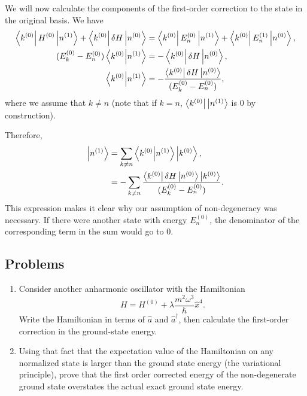 We will now calculate the components of the first-order correction to the state in the original basis. We have 
\begin{align*} 
\left\langle k^{(0)} \right|H^{(0)} \left| n^{(1)} \right\rangle + \left\langle k^{(0)} \right|\delta H \left| n^{(0)} \right\rangle &= \left\langle k^{(0)} \right|E_n^{(0)} \left| n^{(1)} \right\rangle + \left\langle k^{(0)} \right|E_n^{(1)} \left| n^{(0)} \right\rangle, \\
(E_k^{(0)}-E_n^{(0)}) \left\langle k^{(0)} \middle| n^{(1)} \right\rangle &= - \left\langle k^{(0)} \right| \delta H \left| n^{(0)} \right\rangle , \\
\left\langle k^{(0)} \middle| n^{(1)} \right\rangle &= -\frac{\left\langle k^{(0)} \right| \delta H \left| n^{(0)} \right\rangle}{(E_k^{(0)}-E_n^{(0)})},
\end{align*}
where we assume that $k \neq n$ (note that if $k=n$, $\left\langle k^{(0)} \right|\left| n^{(1)} \right\rangle$ is $0$ by construction).

Therefore,
\begin{align}
\left| n^{(1)} \right\rangle &= \sum_{k \neq n} \left\langle k^{(0)} \middle| n^{(1)} \right\rangle\left| k^{(0)} \right\rangle, \nonumber \\
&= -\sum_{k \neq n} \frac{\left\langle k^{(0)} \right| \delta H \left| n^{(0)} \right\rangle \left| k^{(0)} \right\rangle}{(E_k^{(0)}-E_n^{(0)})}. \label{eq:nondegenn1}
\end{align}
This expression makes it clear why our assumption of non-degeneracy was necessary. If there were another state with energy $E_n^{(0)}$, the denominator of the corresponding term in the sum would go to $0$.
\subsection*{Problems}
\begin{enumerate}
\item Consider another anharmonic oscillator with the Hamiltonian $$H = H^{(0)} + \lambda \frac{m^2 \omega^3}{\hbar} \hat{x}^4.$$ Write the Hamiltonian in terms of $\hat{a}$ and $\hat{a}^{\dagger}$, then calculate the first-order correction in the ground-state energy. 
\item Using that fact that the expectation value of the Hamiltonian on any normalized state is larger than the ground state energy (the variational principle), prove that the first order corrected energy of the non-degenerate ground state overstates the actual exact ground state energy.
\end{enumerate}
